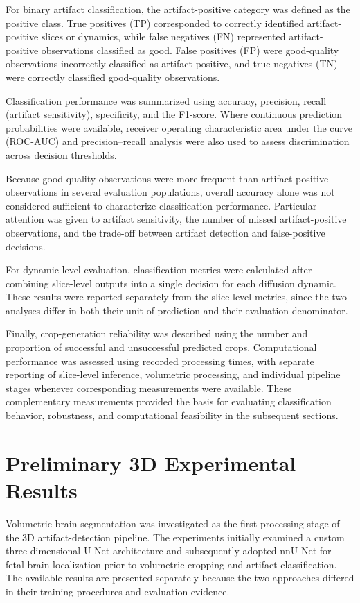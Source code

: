 For binary artifact classification, the artifact-positive category was defined as the positive class. True positives (TP) corresponded to correctly identified artifact-positive slices or dynamics, while false negatives (FN) represented artifact-positive observations classified as good. False positives (FP) were good-quality observations incorrectly classified as artifact-positive, and true negatives (TN) were correctly classified good-quality observations.

Classification performance was summarized using accuracy, precision, recall (artifact sensitivity), specificity, and the F1-score. Where continuous prediction probabilities were available, receiver operating characteristic area under the curve (ROC-AUC) and precision--recall analysis were also used to assess discrimination across decision thresholds.

Because good-quality observations were more frequent than artifact-positive observations in several evaluation populations, overall accuracy alone was not considered sufficient to characterize classification performance. Particular attention was given to artifact sensitivity, the number of missed artifact-positive observations, and the trade-off between artifact detection and false-positive decisions.

For dynamic-level evaluation, classification metrics were calculated after combining slice-level outputs into a single decision for each diffusion dynamic. These results were reported separately from the slice-level metrics, since the two analyses differ in both their unit of prediction and their evaluation denominator.

Finally, crop-generation reliability was described using the number and proportion of successful and unsuccessful predicted crops. Computational performance was assessed using recorded processing times, with separate reporting of slice-level inference, volumetric processing, and individual pipeline stages whenever corresponding measurements were available. These complementary measurements provided the basis for evaluating classification behavior, robustness, and computational feasibility in the subsequent sections.

\section{Preliminary 3D Experimental Results}
\label{sec:results_3d_segmentation}

Volumetric brain segmentation was investigated as the first processing stage of the 3D artifact-detection pipeline. The experiments initially examined a custom three-dimensional U-Net architecture and subsequently adopted nnU-Net for fetal-brain localization prior to volumetric cropping and artifact classification. The available results are presented separately because the two approaches differed in their training procedures and evaluation evidence.

